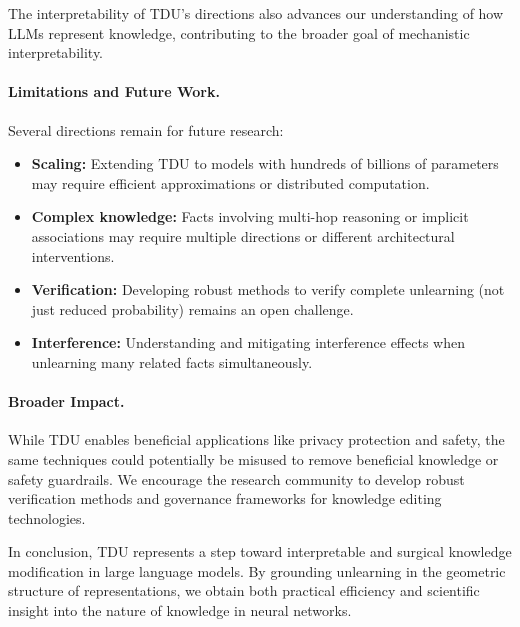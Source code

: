 The interpretability of TDU's directions also advances our understanding of how LLMs represent knowledge, contributing to the broader goal of mechanistic interpretability.

\paragraph{Limitations and Future Work.}
Several directions remain for future research:

\begin{itemize}
    \item \textbf{Scaling:} Extending TDU to models with hundreds of billions of parameters may require efficient approximations or distributed computation.
    
    \item \textbf{Complex knowledge:} Facts involving multi-hop reasoning or implicit associations may require multiple directions or different architectural interventions.
    
    \item \textbf{Verification:} Developing robust methods to verify complete unlearning (not just reduced probability) remains an open challenge.
    
    \item \textbf{Interference:} Understanding and mitigating interference effects when unlearning many related facts simultaneously.
\end{itemize}

\paragraph{Broader Impact.}
While TDU enables beneficial applications like privacy protection and safety, the same techniques could potentially be misused to remove beneficial knowledge or safety guardrails. We encourage the research community to develop robust verification methods and governance frameworks for knowledge editing technologies.

In conclusion, TDU represents a step toward interpretable and surgical knowledge modification in large language models. By grounding unlearning in the geometric structure of representations, we obtain both practical efficiency and scientific insight into the nature of knowledge in neural networks.
